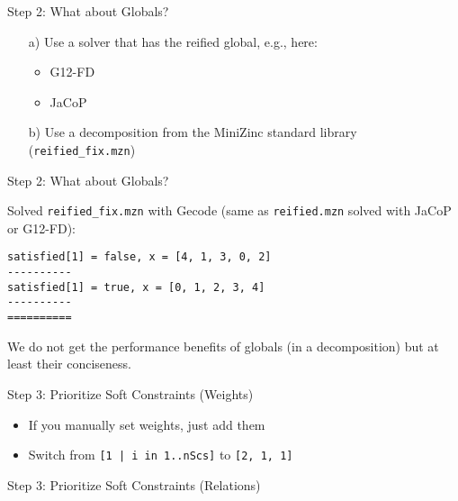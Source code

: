 \documentclass[10pt,xcolor={dvipsnames},fleqn]{beamer}
\begin{document}
\begin{frame}[fragile]{Step 2: What about Globals?}
\begin{enumerate}
\item[a)] Use a solver that has the reified global, e.g., here: 
\begin{itemize}
\item G12-FD
\item JaCoP
\end{itemize}
\item[b)] Use a decomposition from the MiniZinc standard library (\texttt{reified\_fix.mzn})


\end{enumerate}
\end{frame}

\begin{frame}[fragile]{Step 2: What about Globals?}

Solved \texttt{reified\_fix.mzn} with Gecode (same as \texttt{reified.mzn} solved with  JaCoP or G12-FD):
\small

\vspace*{2ex}

\begin{verbatim}
satisfied[1] = false, x = [4, 1, 3, 0, 2]
----------
satisfied[1] = true, x = [0, 1, 2, 3, 4]
----------
==========
\end{verbatim}

\vspace*{2ex}

\normalsize
We do not get the performance benefits of globals (in a decomposition) but at least their conciseness.
\end{frame}

\begin{frame}[fragile]{Step 3: Prioritize Soft Constraints (Weights)}


\begin{itemize}
\item If you manually set weights, just add them
\item Switch from \texttt{[1 | i in 1..nScs]} to \texttt{[2, 1, 1]}
\end{itemize}
\end{frame}

\begin{frame}[fragile]{Step 3: Prioritize Soft Constraints (Relations)}


\end{frame}
\end{document}
